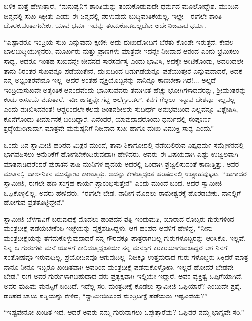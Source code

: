 ಬಳಿಕ ಮತ್ತೆ ಹೇಳುತ್ತಾರೆ, “ಮನುಷ್ಯನಿಗೆ ಶಾಂತಿಯನ್ನು ತಂದುಕೊಡುವುದೇ ಧರ್ಮದ ಮೂಲೋದ್ದೇಶ. ಮುಂದಿನ ಜನ್ಮದಲ್ಲಿ ಸುಖ ಸಿಕ್ಕೀತು ಎಂದು ಈ ಜನ್ಮದಲ್ಲಿ ನರಳುವುದು ಬುದ್ಧಿವಂತಿಕೆಯಲ್ಲ. ಇಲ್ಲೇ—ಈಗಲೇ ಶಾಂತಿ ದೊರಕುವಂತಾಗಬೇಕು. ಯಾವ ಧರ್ಮ ಇದನ್ನು ತಂದುಕೊಡಬಲ್ಲದೋ ಅದೇ ನಿಜವಾದ ಧರ್ಮ.

“ಎಷ್ಟಾದರೂ ಇಂದ್ರಿಯ ಸುಖ ಎನ್ನುವುದು ಕ್ಷಣಿಕ; ಅದು ದುಃಖದೊಂದಿಗೆ ಬೆರೆತು ಕೊಂಡೇ ಇರುತ್ತದೆ. ಕೇವಲ ಬಾಲಬುದ್ಧಿಯುಳ್ಳವರು, ಮೂರ್ಖರು ಮತ್ತು ಪ್ರಾಣಿಗಳು ಮಾತ್ರವೇ ಇದನ್ನೇ ನಿಜವಾದ ಆನಂದ ಎಂದು ಭ್ರಮಿಸಲು ಸಾಧ್ಯ. ಆದರೂ ಇಂತಹ ಸುಖವನ್ನೇ ಜೀವನದ ಸಾರಸರ್ವಸ್ವ ಎಂದು ಭಾವಿಸಿ, ಅದಕ್ಕೇ ಅಂಟಿಕೊಂಡು, ಅದರಿಂದಲೇ ತಾನು ನಿರಂತರ ಸುಖವನ್ನೂ ಪಡೆಯುತ್ತೇನೆ, ದುಃಖದಿಂದ ಬಿಡುಗಡೆಯನ್ನೂ ಪಡೆಯುತ್ತೇನೆ ಎನ್ನುವುದಾದರೆ, ಅದಕ್ಕೆ ನನ್ನ ಅಭ್ಯಂತರವೇನೂ ಇಲ್ಲ. ಆದರೆ ಅಂತಹ ವ್ಯಕ್ತಿಯೊಬ್ಬನನ್ನು ನಾನಿನ್ನೂ ಕಾಣಬೇಕಾ ಗಿದೆ!... ಅಲ್ಲದೆ ಇಂದ್ರಿಯಸುಖವೇ ಅತ್ಯಂತಿಕ ಆನಂದವೆಂದು ಭಾವಿಸುವವರು ತಮಗಿಂತ ಹೆಚ್ಚು ಭೋಗಿಗಳಾದವರನ್ನು, ಶ್ರೀಮಂತರನ್ನು ಕಂಡು ಅಸೂಯೆ ಪಡುತ್ತಾರೆ. ಇಡೀ ಜಗತ್ತನ್ನೇ ಗೆದ್ದ ಅಲೆಗ್ಸಾಂಡರ್, ತನಗೆ ಗೆಲ್ಲಲು ಇನ್ನಾವ ದೇಶವೂ ಇಲ್ಲವಲ್ಲ ಎಂದು ದುಃಖಿಸಿದನಂತೆ! ಆದ್ದರಿಂದಲೇ ಕೆಲವು ಚಿಂತನಶೀಲರು ಸುದೀರ್ಘ ಅನುಭವದಿಂದ ಎಲ್ಲವನ್ನೂ ವಿಶ್ಲೇಷಿಸಿ, ಕೊನೆಗೊಂದು ತೀರ್ಮಾನಕ್ಕೆ ಬಂದಿದ್ದಾರೆ. ಏನೆಂದರೆ, ಯಾವುದಾದರೊಂದು ಧರ್ಮದಲ್ಲಿ ಸಂಪೂರ್ಣ ಶ್ರದ್ಧೆಯುಂಟಾದಾಗ ಮಾತ್ರವೇ ಮನುಷ್ಯನಿಗೆ ನಿಜವಾದ ಸುಖ ಹಾಗೂ ದುಃಖ ವಿಮುಕ್ತಿ ಸಾಧ್ಯ ಎಂದು.”

ಒಂದು ದಿನ ಸ್ವಾಮೀಜಿ ಹರಿಪದ ಮಿತ್ರನ ಮುಂದೆ, ತಾವು ಶಿಕಾಗೋದಲ್ಲಿ ನಡೆಯಲಿರುವ ವಿಶ್ವಧರ್ಮ ಸಮ್ಮೇಳನದಲ್ಲಿ ಭಾಗವಹಿಸಲು ಅಮೆರಿಕೆಗೆ ಹೋಗಬೇಕೆಂದಿರುವುದಾಗಿ ಹೇಳಿದರು. ಅವರು ಈ ವಿಷಯವಾಗಿ ಎಷ್ಟು ಉಜ್ವಲವಾಗಿ ಮಾತನಾಡಿದರೆಂದರೆ ಪುರಾತನ ಪುಷಿ-ಮುನಿಗಳ ಹೃದಯ ಅದರಲ್ಲಿ ಒಂದಾಗಿ ಪ್ರಜ್ವಲಿಸುವಂತೆ ಕಾಣುತ್ತಿತ್ತು. ಅವರ ಮಾತಿನಲ್ಲಿ ದಾರ್ಶನಿಕನ ಮುನ್ನೋಟ ಕಾಣುತ್ತಿತ್ತು. ಅದನ್ನು ಕೇಳುತ್ತಿದ್ದಂತೆ ಹರಿಪದನಲ್ಲಿ ಉತ್ಸಾಹವುಕ್ಕಿತು. “ಹಾಗಾದರೆ ಸ್ವಾಮೀಜಿ, ಈಗಲೇ ಹಣ ಸಂಗ್ರಹ ಕಾರ್ಯ ಪ್ರಾರಂಭಿಸುತ್ತೇನೆ” ಎಂದು ಮುಂದೆ ಬಂದ. ಆದರೆ ಸ್ವಾಮೀಜಿ ಒಪ್ಪಿಕೊಳ್ಳಲಿಲ್ಲ. ಅವರು ಹೇಳಿದರು. “ಈಗಲೇ ಬೇಡ. ನಾನೀಗ ಮೊದಲು ರಾಮೇಶ್ವರಕ್ಕೆ ಹೊರಡಬೇಕು. ನಾನಲ್ಲಿಗೆ ಹೋಗುವ ವ್ರತತೊಟ್ಟಿದ್ದೇನೆ.”

ಸ್ವಾಮೀಜಿ ಬೆಳಗಾವಿಗೆ ಬರುವುದಕ್ಕೆ ಮೊದಲು ಹರಿಪದನ ಪತ್ನಿ ಇಂದುಮತಿ, ಯಾರಾದ ರೊಬ್ಬರು ಗುರುಗಳಿಂದ ಮಂತ್ರದೀಕ್ಷೆ ಪಡೆಯಬೇಕೆಂಬ ಇಚ್ಛೆಯನ್ನು ವ್ಯಕ್ತಪಡಿಸಿದ್ದಳು. ಆಗ ಹರಿಪದ ಅವಳಿಗೆ ಹೇಳಿದ್ದ, “ನೀನು ಮಂತ್ರದೀಕ್ಷೆಯನ್ನು ತೆಗೆದುಕೊಳ್ಳುವುದಾದರೆ ನನ್ನ ಗೌರವಕ್ಕೂ ಪಾತ್ರರಾಗಬಲ್ಲ ಗುರುಗಳೊಬ್ಬರನ್ನು ಆರಿಸಿಕೊ. ಇಲ್ಲವೆ, ನಿನ್ನ ಆ ಗುರುಗಳು ಮನೆ ಯೊಳಗೆ ಕಾಲಿಡುತ್ತಿದ್ದಂತೆಯೇ ನನ್ನ ಮನಸ್ಸಿಗೆ ಕಿರಿಕಿರಿಯಾಗುವಂತಿದ್ದರೆ ಆಗ ನಿನಗೆ ಸಂತೋಷವೂ ಇರುವುದಿಲ್ಲ, ಪ್ರಯೋಜನವೂ ಆಗುವುದಿಲ್ಲ. ನಿಜಕ್ಕೂ ಉತ್ತಮರಾದ ಗುರು ಗಳೊಬ್ಬರು ಸಿಕ್ಕಿದರೆ ಮಾತ್ರ ನಾನೂ ನೀನೂ ಇಬ್ಬರೂ ಖಂಡಿತವಾಗಿ ಅವರಿಂದ ಮಂತ್ರದೀಕ್ಷೆ ಪಡೆದುಕೊಳ್ಳೋಣ. ಇಲ್ಲದೆ ಹೋದರೆ ಬೇಡವೇ ಬೇಡ.” ಈಗ ಅವರ ಗುರುಗಳಾಗಬಹುದಾದ ವರು ಪ್ರತ್ಯಕ್ಷವಾಗಿ ಇಲ್ಲಿಯೇ ಇದ್ದಾರೆ. ಅವರ ವ್ಯಕ್ತಿತ್ವ ಒಪ್ಪಿಗೆಯಾಗಿದೆ. ಅವರ ಮಹಿಮೆ ಮನಸ್ಸಿಗೆ ಬಂದಿದೆ. ಇದೆಲ್ಲ ಸರಿ. ಮಂತ್ರದೀಕ್ಷೆ ಕೊಡಲು ಸ್ವಾಮೀಜಿ ಒಪ್ಪಿಯಾರೆ? ಎಂಬುದೇ ಪ್ರಶ್ನೆ. ಹರಿಪದ ಬಾಬು ಪತ್ನಿಯನ್ನು ಕೇಳಿದ, “ಸ್ವಾಮೀಜಿಯಿಂದ ಮಂತ್ರಿದೀಕ್ಷೆ ಪಡೆಯಲು ಇಷ್ಟವಿದೆಯೆ?”

“ಇಷ್ಟವೇನೋ ಖಂಡಿತ ಇದೆ. ಆದರೆ ಅವರು ನಮ್ಮ ಗುರುವಾಗಲು ಒಪ್ಪುತ್ತಾರೆಯೆ? ಒಪ್ಪಿದರೆ ನಮ್ಮ ಭಾಗ್ಯವೇ ಸರಿ.”

